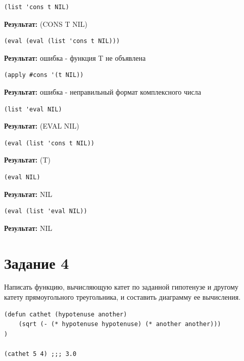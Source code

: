 \begin{lstlisting}
(list 'cons t NIL)
\end{lstlisting}
\textbf{Результат:} (CONS T NIL)

\begin{lstlisting}
(eval (eval (list 'cons t NIL)))
\end{lstlisting}
\textbf{Результат:} ошибка - функция T не объявлена

\begin{lstlisting}
(apply #cons '(t NIL))
\end{lstlisting}
\textbf{Результат:} ошибка - неправильный формат комплексного числа

\begin{lstlisting}
(list 'eval NIL)
\end{lstlisting}
\textbf{Результат:} (EVAL NIL)

\begin{lstlisting}
(eval (list 'cons t NIL))
\end{lstlisting}
\textbf{Результат:} (T)

\begin{lstlisting}
(eval NIL)
\end{lstlisting}
\textbf{Результат:} NIL

\begin{lstlisting}
(eval (list 'eval NIL))
\end{lstlisting}
\textbf{Результат:}  NIL

\section{Задание \No{}4}

Написать функцию, вычисляющую катет по заданной гипотенузе и другому катету
прямоугольного треугольника, и составить диаграмму ее вычисления.

\begin{lstlisting}
(defun cathet (hypotenuse another)
    (sqrt (- (* hypotenuse hypotenuse) (* another another)))
)

(cathet 5 4) ;;; 3.0
\end{lstlisting}

